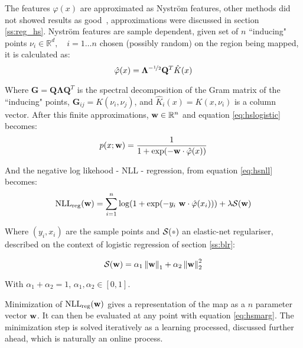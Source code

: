 The features $\varphi(x)$ are approximated as Nystr\"om features, other
methods did not showed results as good~\cite{ramos2016hilbert}, approximations
were discussed in section \ref{ss:reg_hs}. Nystr\"om features are sample
dependent, given set of $n$ ``inducing" points $\nu_i\in\mathbb{R}^d, \quad
i=1\ldots n$ chosen (possibly random) on the region being mapped, it is
calculated as:
\begin{equation}
\label{eq:nystrom}
\hat\varphi(x) = \mathbf{\Lambda}^{-\nicefrac{1}{2}}\mathbf{Q}^T\hat K(x)
\end{equation}
 
 Where $\mathbf{G}=\mathbf{Q}\mathbf{\Lambda}\mathbf{Q}^T$ is the
 spectral decomposition of the Gram matrix of the ``inducing" points,
 $\mathbf{G}_{ij}=K(\nu_i,\nu_j)$, and ${\displaystyle\hat K}_i(x) = K(x,\nu_i)$
 is a column vector. After this finite approximations,
 $\mathrm{\mathbf{w}}\in\mathbb{R}^n$ and equation \ref{eq:hslogistic} becomes:
\begin{equation}
\label{eq:hsmarg}
p(x;\mathrm{\mathbf{w}}) = \frac{1}{1+\exp(-\mathrm{\mathbf{w}}\cdot \hat\varphi(x))}
\end{equation}
 
 And the negative log likehood - NLL - regression, from equation \ref{eq:hsnll}
 becomes:
\begin{equation}
\label{eq:finitenll}
\text{NLL}_{\text{reg}}(\mathrm{\mathbf{w}}) =  \sum_{i=1}^n \log(1+\exp(-y_i~
\mathrm{\mathbf{w}}\cdot\hat\varphi(x_i))) +\lambda\mathcal{S}(\mathrm{\mathbf{w}})
\end{equation}
 
 Where $(y_i,x_i)$ are the sample points and $\mathcal{S}(\parm)$ an
 elastic-net regulariser, described on the context of logistic regression of section \ref{ss:blr}:
  
\begin{equation}
\label{eq:elasticnet}
\mathcal{S}(\mathrm{\mathbf{w}})=\alpha_1\left\lVert\mathrm{\mathbf{w}}\right\rVert_1 + \alpha_2\left\lVert\mathrm{\mathbf{w}}\right\rVert_2^2
\end{equation}

With $\alpha_1+\alpha_2=1$, $\alpha_1,\alpha_2\in[0,1]$.

Minimization of $\text{NLL}_{\text{reg}}(\mathrm{\mathbf{w}})$ gives a representation of
the map as a $n$ parameter vector $\mathrm{\mathbf{w}}$. It can then be evaluated at any
point with equation \ref{eq:hsmarg}. The minimization step is solved iteratively
as a learning processed, discussed further ahead, which is naturally an online
process.
 
 
